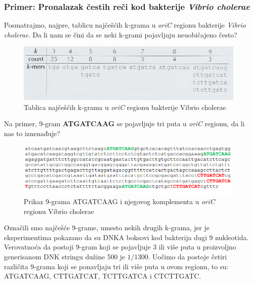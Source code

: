 \subsubsection{Primer: Pronalazak čestih reči kod bakterije \textit{Vibrio cholerae}} 

Posmatrajmo, najpre, tablicu najčešćih k-grama u \textit{oriC} regionu bakterije \textit{Vibrio cholerae}. Da li nam se čini da se neki k-grami pojavljuju neuobičajeno često?\\ 

\begin{figure}[h]
\caption{Tablica najčešćih k-grama u \textit{oriC} regionu bakterije Vibrio cholerae}
\centering
\includegraphics[width=1\textwidth]{poglavlja/1/slike/Tablica_VC.png}
\end{figure} 

Na primer, 9-gram \textbf{ATGATCAAG} se pojavljuje tri puta u \textit{oriC} regionu, da li nas to iznenađuje?\\

\begin{figure}[h]
\caption{Prikaz 9-grama ATGATCAAG i njegovog komplementa u \textit{oriC} regionu Vibrio cholerae}
\centering
\includegraphics[width=1\textwidth]{poglavlja/1/slike/9_VC.png}
\end{figure} 

Označili smo najčešće 9-grame, umesto nekih drugih k-grama, jer je eksperimentima pokazano da su DNKA boksovi kod bakterija dugi 9 nukleotida. Verovatnoća da postoji 9-gram koji se pojavljuje 3 ili više puta u proizvoljno generisanom DNK stringu dužine 500 je $1/1300$. Uočimo da postoje četiri različita 9-grama koji se ponavljaju tri ili više puta u ovom regionu, to su: ATGATCAAG, CTTGATCAT, TCTTGATCA i CTCTTGATC.\\\\

